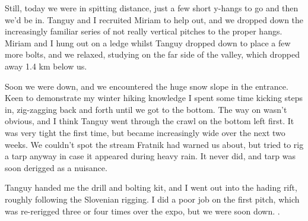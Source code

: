 Still, today we were in spitting distance, just a few short y-hangs to go and then we’d be in. Tanguy and I recruited Miriam to help out, and we dropped down the increasingly familiar series of not really vertical pitches to the proper hangs. Miriam and I hung out on a ledge whilst Tanguy dropped down to place a few more bolts, and we relaxed, studying  on the far side of the  valley, which dropped away 1.4 km below us.

\begin{figure}[b!]
\end{figure}

Soon we were down, and we encountered the huge snow slope in the entrance. Keen to demonstrate my winter hiking knowledge I spent some time kicking steps in, zig-zagging back and forth until we got to the bottom. The way on wasn’t obvious, and I think Tanguy went through the crawl on the bottom left first. It was very tight the first time, but became increasingly wide over the next two weeks. We couldn’t spot the stream Fratnik had warned us about, but tried to rig a tarp anyway in case it appeared during heavy rain. It never did, and tarp was soon derigged as a nuisance.

Tanguy handed me the drill and bolting kit, and I went out into the hading rift, roughly following the Slovenian rigging. I did a poor job on the first pitch, which was re-rerigged three or four times over the expo, but we were soon down. .

